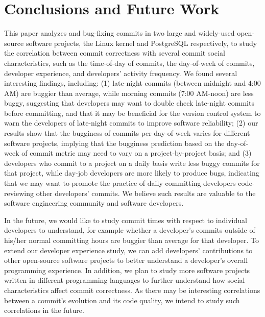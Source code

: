 \section{Conclusions and Future Work}
\label{sec-conclusion}

This paper analyzes \linuxBFC and \postBFC bug-fixing commits in two large and
widely-used open-source software projects, the Linux kernel and PostgreSQL
respectively, to study the correlation between commit correctness with several
commit social characteristics, such as the time-of-day of commits, the
day-of-week of commits, developer experience, and developers' activity
frequency. We found several interesting findings, including: (1) late-night
commits (between midnight and 4:00 AM) are buggier than average, while morning
commits (7:00 AM-noon) are less buggy, suggesting that developers may want to
double check late-night commits before committing, and that it may be beneficial
for the version control system to warn the developers of late-night commits to
improve software reliability; (2) our results show that the bugginess of commits
per day-of-week varies for different software projects, implying that the
bugginess prediction based on the day-of-week of commit metric may need to vary
on a project-by-project basis; and (3) developers who commit to a project on a
daily basis write less buggy commits for that project, while day-job developers
are more likely to produce bugs, indicating that we may want to promote the
practice of daily committing developers code-reviewing other developers'
commits.  We believe such results are valuable to the software engineering
community and software developers.

In the future, we would like to study commit times with respect to individual
developers to understand, for example whether a developer's commits outside of
his/her normal committing hours are buggier than average for that developer.  To
extend our developer experience study, we can add developers' contributions to
other open-source software projects to better understand a developer's overall
programming experience.  In addition, we plan to study more software projects
written in different programming languages to further understand how social
characteristics affect commit correctness.  As there may be interesting
correlations between a commit's evolution and its code quality, we intend to
study such correlations in the future.


